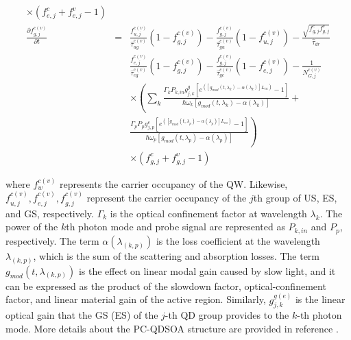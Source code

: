 \documentclass[twocolumn]{el-author}
\begin{document}
\begin{eqnarray}
	\times
	\left( f^{c}_{e,j} + f^{v}_{e,j} - 1 \right)
  \\
  \label{eq:pc_qd_gs}
  \frac{ {\partial}f^{c(v)}_{g,j} }{ {\partial}t } & = & 
	\frac{ f^{c(v)}_{u,j} }{ \hat{\tau}^{c(v)}_{ug} }	\left(1 - f^{c(v)}_{g,j}\right) -
	\frac{ f^{c(v)}_{g,j} }{ \hat{\tau}^{c(v)}_{gu} }	\left(1 - f^{c(v)}_{u,j}\right) - 
	\frac{ \sqrt{ f^{c}_{g,j} f^{v}_{g,j} } }{ \hat{\tau}_{dr} } \nonumber\\ &&
	\frac{ f^{c(v)}_{e,j} }{ \hat{\tau}^{c(v)}_{eg} } \left(1 - f^{c(v)}_{g,j}\right) -
	\frac{ f^{c(v)}_{g,j} }{ \hat{\tau}^{c(v)}_{ge} } \left(1 - f^{c(v)}_{e,j}\right) - \frac{1}{N^{c(v)}_{G,j}} \nonumber\\ &&
	\times \left(\sum_{k} 
	\frac
		{\Gamma_{k}P_{k,in}g^{g}_{j,k}\left[e^{\left(\left[g_{mod}(t,\lambda_{k}) - \alpha(\lambda_{k})\right]L_{ca}\right)} - 1\right]}
		{\hbar \omega_{k}\left[g_{mod}(t,\lambda_{k}) - \alpha(\lambda_{k})\right]} + \right. \nonumber\\ && 
	\left.
	\frac
		{\Gamma_{p}P_{p}g^{e}_{j,p}\left[e^{\left(\left[g_{mod}(t,\lambda_{p}) - \alpha(\lambda_{p})\right]L_{ca}\right)} - 1\right]}
		{\hbar \omega_{p}\left[g_{mod}(t,\lambda_{p}) - \alpha(\lambda_{p})\right]}
	\right) \nonumber\\ &&
	\times
	\left( f^{c}_{g,j} + f^{v}_{g,j} - 1 \right)
\end{eqnarray}
\endgroup

where $f^{c(v)}_{w}$ represents the carrier occupancy of the QW. Likewise, $f^{c(v)}_{u,j},f^{c(v)}_{e,j},f^{c(v)}_{g,j}$ represent the carrier occupancy of the $j$th group of US, ES, and GS, respectively. $\Gamma_{k}$ is the optical confinement factor at wavelength $\lambda_{k}$. The power of the $k$th photon mode and probe signal are represented as $P_{k,in}$ and $P_{p}$, respectively. The term $\alpha(\lambda_{(k,p)})$ is the loss coefficient at the wavelength $\lambda_{(k,p)}$, which is the sum of the scattering and absorption losses. The term $g_{mod}(t,\lambda_{(k,p)})$ is the effect on linear modal gain caused by slow light, and it can be expressed as the product of the slowdown factor, optical-confinement factor, and linear material gain of the active region. Similarly,
$g^{g(e)}_{j,k}$ is the linear optical gain that the GS (ES) of the $j$-th QD group provides to the $k$-th photon mode. More details about the PC-QDSOA structure are provided in reference {\cite{pcqdsoa}}.
\end{document}
